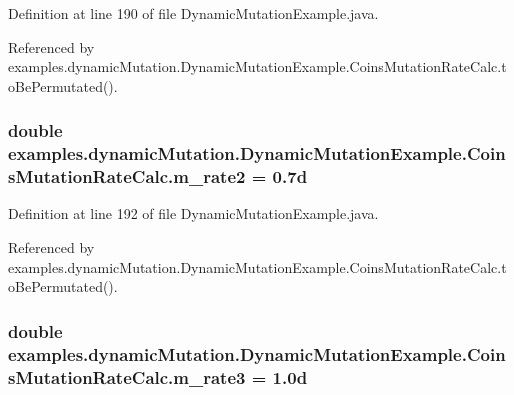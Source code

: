 Definition at line 190 of file Dynamic\-Mutation\-Example.\-java.



Referenced by examples.\-dynamic\-Mutation.\-Dynamic\-Mutation\-Example.\-Coins\-Mutation\-Rate\-Calc.\-to\-Be\-Permutated().

\hypertarget{classexamples_1_1dynamic_mutation_1_1_dynamic_mutation_example_1_1_coins_mutation_rate_calc_a85e1e3d4f5fa8de787245bb5a04f469b}{
\subsubsection[{m\-\_\-rate2}]{\setlength{\rightskip}{0pt plus 5cm}double examples.\-dynamic\-Mutation.\-Dynamic\-Mutation\-Example.\-Coins\-Mutation\-Rate\-Calc.\-m\-\_\-rate2 = 0.\-7d\hspace{0.3cm}{\ttfamily [private]}}}\label{classexamples_1_1dynamic_mutation_1_1_dynamic_mutation_example_1_1_coins_mutation_rate_calc_a85e1e3d4f5fa8de787245bb5a04f469b}


Definition at line 192 of file Dynamic\-Mutation\-Example.\-java.



Referenced by examples.\-dynamic\-Mutation.\-Dynamic\-Mutation\-Example.\-Coins\-Mutation\-Rate\-Calc.\-to\-Be\-Permutated().

\hypertarget{classexamples_1_1dynamic_mutation_1_1_dynamic_mutation_example_1_1_coins_mutation_rate_calc_a987da9386c5ff26b545f489ed94fe5f4}{
\subsubsection[{m\-\_\-rate3}]{\setlength{\rightskip}{0pt plus 5cm}double examples.\-dynamic\-Mutation.\-Dynamic\-Mutation\-Example.\-Coins\-Mutation\-Rate\-Calc.\-m\-\_\-rate3 = 1.\-0d\hspace{0.3cm}{\ttfamily [private]}}}\label{classexamples_1_1dynamic_mutation_1_1_dynamic_mutation_example_1_1_coins_mutation_rate_calc_a987da9386c5ff26b545f489ed94fe5f4}


